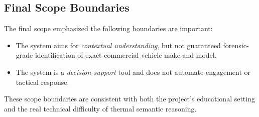\subsection{Final Scope Boundaries}

The final scope emphasized the following boundaries are important:

\begin{itemize}[nosep]
  \item The system aims for \emph{contextual understanding}, but not guaranteed forensic-
    grade identification of exact commercial vehicle make and model.
  \item The system is a \emph{decision-support} tool and does not automate engagement or
    tactical response.
\end{itemize}

These scope boundaries are consistent with both the project's educational setting and the
real technical difficulty of thermal semantic reasoning.
